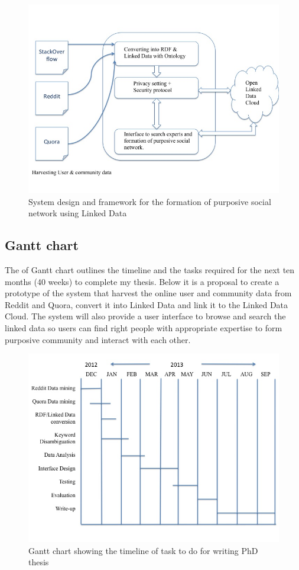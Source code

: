 \begin{figure}[!htb]
  \centering
  \includegraphics[width=15cm]{Slide2.jpg}
  \caption{System design and framework for the formation of purposive social network using Linked Data}
  \label{Figure:figex5a}
\end{figure}

\subsection{Gantt chart}

The  of  Gantt chart outlines the timeline and the tasks required for the next ten months (40 weeks) to complete my thesis. Below it is a proposal to create a prototype of the system that harvest the online user and community data from Reddit and Quora, convert it into Linked Data and link it to the Linked Data Cloud.  The system will also provide a user interface to browse and search the linked data so users can find right people with appropriate expertise to form purposive community and interact with each other.

\begin{figure}[!htb]
  \centering
  \includegraphics[width=15cm]{Slide1.jpg}
  \caption{Gantt chart showing the timeline of task to do for writing PhD thesis}
  \label{Figure:figex5b}
\end{figure}

